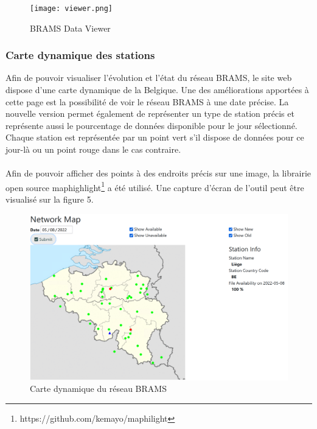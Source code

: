 \documentclass[11pt]{article}
\begin{document}
\begin{figure}[t]
    \begin{center}
        \texttt{[image: viewer.png]}
        \caption{BRAMS Data Viewer}
    \end{center}
\end{figure}

\subsubsection{Carte dynamique des stations}

Afin de pouvoir visualiser l'évolution et l'état du réseau BRAMS, le site web dispose d'une carte dynamique de la Belgique.
Une des améliorations apportées à cette page est la possibilité de voir le réseau BRAMS à une date précise.
La nouvelle version permet également de représenter un type de station précis et représente aussi le pourcentage de données disponible pour le jour sélectionné.
Chaque station est représentée par un point vert s'il dispose de données pour ce jour-là ou un point rouge dans le cas contraire.\\
\\
Afin de pouvoir afficher des points à des endroits précis sur une image, la librairie open source maphighlight\footnote{https://github.com/kemayo/maphilight} a été utilisé.
Une capture d'écran de l'outil peut être visualisé sur la figure 5.

\begin{figure}[t]
    \begin{center}
        \includegraphics[scale=0.25]{map.png}
        \caption{Carte dynamique du réseau BRAMS}
    \end{center}
\end{figure}
\end{document}
